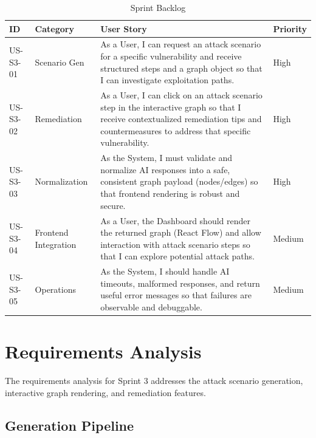 \begin{table}[H]
  \centering
  \caption{Sprint Backlog}
  \label{tab:sprint-backlog-s3}
  \renewcommand{\arraystretch}{1.35}
  \small
  \setlength{\tabcolsep}{8pt}
  \begin{tabularx}{\textwidth}{|>{\centering\arraybackslash}p{1.6cm}|>{\centering\arraybackslash}p{2.2cm}|>{\raggedright\arraybackslash}X|>{\centering\arraybackslash}p{1.2cm}|}
    \hline
    \textbf{ID} & \textbf{Category} & \textbf{User Story} & \textbf{Priority} \\
    \hline
    US-S3-01 & Scenario Gen & As a User, I can request an attack scenario for a specific vulnerability and receive structured steps and a graph object so that I can investigate exploitation paths. & High \\
    \hline
    US-S3-02 & Remediation & As a User, I can click on an attack scenario step in the interactive graph so that I receive contextualized remediation tips and countermeasures to address that specific vulnerability. & High \\
    \hline
    US-S3-03 & Normalization & As the System, I must validate and normalize AI responses into a safe, consistent graph payload (nodes/edges) so that frontend rendering is robust and secure. & High \\
    \hline
    US-S3-04 & Frontend Integration & As a User, the Dashboard should render the returned graph (React Flow) and allow interaction with attack scenario steps so that I can explore potential attack paths. & Medium \\
    \hline
    US-S3-05 & Operations & As the System, I should handle AI timeouts, malformed responses, and return useful error messages so that failures are observable and debuggable. & Medium \\
    \hline
  \end{tabularx}
\end{table}

\section{Requirements Analysis}

\justifying
The requirements analysis for Sprint 3 addresses the attack scenario generation, interactive graph rendering, and remediation features.

\subsection{Generation Pipeline}

